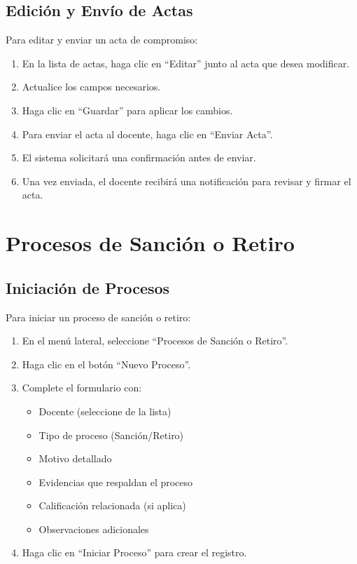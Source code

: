 \documentclass[12pt,a4paper]{book}
\begin{document}
\subsection{Edición y Envío de Actas}
Para editar y enviar un acta de compromiso:

\begin{enumerate}
    \item En la lista de actas, haga clic en ``Editar'' junto al acta que desea modificar.
    \item Actualice los campos necesarios.
    \item Haga clic en ``Guardar'' para aplicar los cambios.
    \item Para enviar el acta al docente, haga clic en ``Enviar Acta''.
    \item El sistema solicitará una confirmación antes de enviar.
    \item Una vez enviada, el docente recibirá una notificación para revisar y firmar el acta.
\end{enumerate}

\section{Procesos de Sanción o Retiro}
\subsection{Iniciación de Procesos}
Para iniciar un proceso de sanción o retiro:

\begin{enumerate}
    \item En el menú lateral, seleccione ``Procesos de Sanción o Retiro''.
    \item Haga clic en el botón ``Nuevo Proceso''.
    \item Complete el formulario con:
    \begin{itemize}
        \item Docente (seleccione de la lista)
        \item Tipo de proceso (Sanción/Retiro)
        \item Motivo detallado
        \item Evidencias que respaldan el proceso
        \item Calificación relacionada (si aplica)
        \item Observaciones adicionales
    \end{itemize}
    \item Haga clic en ``Iniciar Proceso'' para crear el registro.
\end{enumerate}
\end{document}
